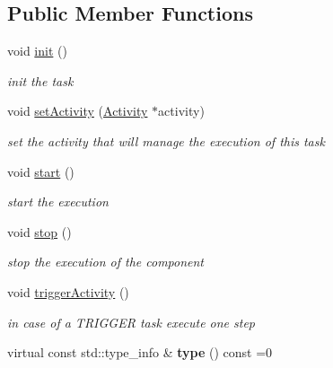 \subsection*{Public Member Functions}
\begin{DoxyCompactItemize}
\item 
\hypertarget{classcoco_1_1_task_context_a718a106ecaad200f182719e343ba3214}{void \hyperlink{classcoco_1_1_task_context_a718a106ecaad200f182719e343ba3214}{init} ()}\label{classcoco_1_1_task_context_a718a106ecaad200f182719e343ba3214}

\begin{DoxyCompactList}\small\item\em init the task \end{DoxyCompactList}\item 
\hypertarget{classcoco_1_1_task_context_a66769b9863ddc426776f67905b9cbfc2}{void \hyperlink{classcoco_1_1_task_context_a66769b9863ddc426776f67905b9cbfc2}{set\-Activity} (\hyperlink{classcoco_1_1_activity}{Activity} $\ast$activity)}\label{classcoco_1_1_task_context_a66769b9863ddc426776f67905b9cbfc2}

\begin{DoxyCompactList}\small\item\em set the activity that will manage the execution of this task \end{DoxyCompactList}\item 
\hypertarget{classcoco_1_1_task_context_a1e631768ca31e55c4c2605320df997fc}{void \hyperlink{classcoco_1_1_task_context_a1e631768ca31e55c4c2605320df997fc}{start} ()}\label{classcoco_1_1_task_context_a1e631768ca31e55c4c2605320df997fc}

\begin{DoxyCompactList}\small\item\em start the execution \end{DoxyCompactList}\item 
\hypertarget{classcoco_1_1_task_context_ae8fe9cb7eec3d3f57d57cd692e781785}{void \hyperlink{classcoco_1_1_task_context_ae8fe9cb7eec3d3f57d57cd692e781785}{stop} ()}\label{classcoco_1_1_task_context_ae8fe9cb7eec3d3f57d57cd692e781785}

\begin{DoxyCompactList}\small\item\em stop the execution of the component \end{DoxyCompactList}\item 
\hypertarget{classcoco_1_1_task_context_a72a5550fc3d0ceba03f8b091852d71f6}{void \hyperlink{classcoco_1_1_task_context_a72a5550fc3d0ceba03f8b091852d71f6}{trigger\-Activity} ()}\label{classcoco_1_1_task_context_a72a5550fc3d0ceba03f8b091852d71f6}

\begin{DoxyCompactList}\small\item\em in case of a T\-R\-I\-G\-G\-E\-R task execute one step \end{DoxyCompactList}\item 
\hypertarget{classcoco_1_1_task_context_a66ec10f5b0f28a717cdc9c76110441fd}{virtual const std\-::type\-\_\-info \& {\bfseries type} () const =0}\label{classcoco_1_1_task_context_a66ec10f5b0f28a717cdc9c76110441fd}

\end{DoxyCompactItemize}
